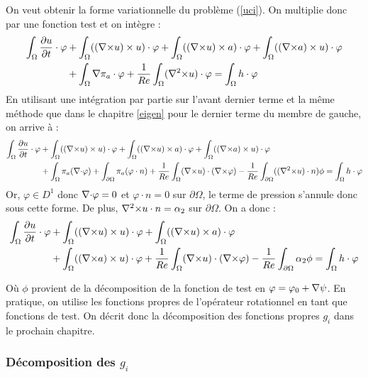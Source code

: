 On veut obtenir la forme variationnelle du problème (\ref{uci}). On multiplie donc par une fonction test et on intègre :
\begin{align*}
\int_\Omega \frac{\partial u}{\partial t}\cdot \varphi &+ \int_\Omega (({\nabla\times} u)\times u)\cdot \varphi + \int_\Omega (({\nabla\times} u)\times a)\cdot\varphi + \int_\Omega (({\nabla\times} a)\times u)\cdot\varphi \\
&+ \int_\Omega {\nabla}\pi_a\cdot\varphi + \frac{1}{Re}\int_\Omega ({\nabla^2\times} u)\cdot\varphi = \int_\Omega h\cdot\varphi
\end{align*}
En utilisant une intégration par partie sur l'avant dernier terme et la même méthode que dans le chapitre \ref{eigen} pour le dernier terme du membre de gauche, on arrive à :
\begin{align*}
\int_\Omega \frac{\partial u}{\partial t}\cdot \varphi &+ \int_\Omega (({\nabla\times} u)\times u)\cdot \varphi + \int_\Omega (({\nabla\times} u)\times a)\cdot\varphi + \int_\Omega (({\nabla\times} a)\times u)\cdot\varphi\\
&+ \int_\Omega \pi_a({\nabla\cdot}\varphi) + \int_{\partial \Omega} \pi_a(\varphi\cdot n) + \frac{1}{Re}\int_\Omega ({\nabla\times} u)\cdot({\nabla\times}\varphi) -\frac{1}{Re}\int_{\partial\Omega} (({\nabla^2\times} u)\cdot n)\phi = \int_\Omega h\cdot\varphi
\end{align*}
Or, $\varphi\in D^1$ donc ${\nabla\cdot}\varphi=0$ et $\varphi\cdot n=0$ sur $\partial\Omega$, le terme de pression s'annule donc sous cette forme. De plus, ${\nabla^2\times} u\cdot n=\alpha_2$ sur $\partial\Omega$. On a donc :
\begin{eqnarray}
\label{fvu}
\begin{aligned}
\int_\Omega \frac{\partial u}{\partial t}\cdot \varphi &+ \int_\Omega (({\nabla\times} u)\times u)\cdot \varphi + \int_\Omega (({\nabla\times} u)\times a)\cdot\varphi \\
&+ \int_\Omega (({\nabla\times} a)\times u)\cdot\varphi + \frac{1}{Re}\int_\Omega ({\nabla\times} u)\cdot({\nabla\times}\varphi) -\frac{1}{Re}\int_{\partial\Omega} \alpha_2\phi = \int_\Omega h\cdot\varphi
\end{aligned}
\end{eqnarray}

Où $\phi$ provient de la décomposition de la fonction de test en $\varphi=\varphi_0+{\nabla}\psi$. En pratique, on utilise les fonctions propres de l'opérateur rotationnel en tant que fonctions de test.
On décrit donc la décomposition des fonctions propres $g_i$ dans le prochain chapitre.

\subsubsection{Décomposition des $g_i$}
\label{decomp}

